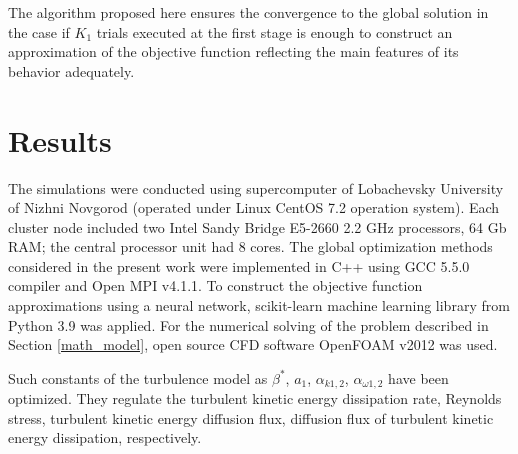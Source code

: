 \documentclass[applsci,article,submit,moreauthors,pdftex]{Definitions/mdpi}
\begin{document}
The algorithm proposed here ensures the convergence to the global solution in the case if $K_1$ trials executed at the first stage is enough to construct an approximation of the objective function reflecting the main features of its behavior adequately.




\section{Results}





The simulations were conducted using supercomputer of Lobachevsky University of Nizhni Novgorod (operated under Linux CentOS 7.2 operation system). Each cluster node included two  Intel Sandy Bridge E5-2660 2.2 GHz processors, 64 Gb RAM; the central processor unit had 8 cores. 
The global optimization methods considered in the present work were implemented in C++ using GCC 5.5.0 compiler and Open MPI v4.1.1. To construct the objective function approximations using a neural network, scikit-learn machine learning library from Python 3.9 was applied. 
For the numerical solving of the problem described in Section \ref{math_model}, open source CFD software OpenFOAM v2012 \cite{OpenFOAM} was used.

Such constants of the turbulence model as $\beta^*$, $a_1$, $\alpha_{k 1,2}$, $\alpha_{\omega 1,2}$ have been optimized. They regulate the turbulent kinetic energy dissipation rate, Reynolds stress, turbulent kinetic energy diffusion flux, diffusion flux of turbulent kinetic energy dissipation, respectively.
\end{document}

